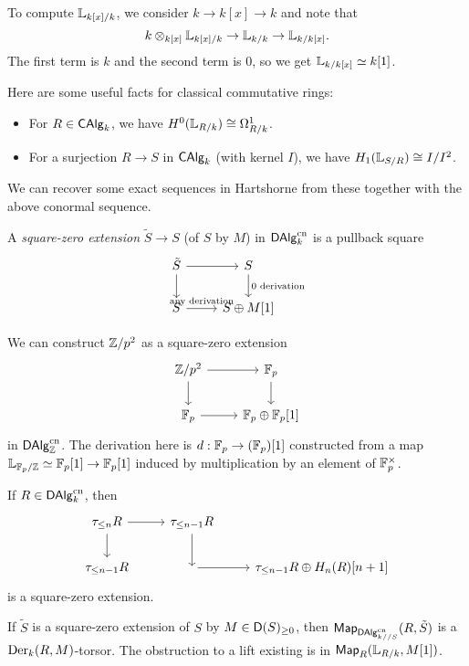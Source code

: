 \documentclass{amsart}
\begin{document}
\begin{ex}
	To compute $\mathbb{L}_{k[x]/k}$, we consider $k \to k[x] \to k$ and note that
	\[
		k \otimes_{k[x]} \mathbb{L}_{k[x]/k} \to \mathbb{L}_{k/k} \to \mathbb{L}_{k/k[x]}.
	\]
	The first term is $k$ and the second term is $0$, so we get $\mathbb{L}_{k/k[x]} \simeq k[1]$.
\end{ex}

Here are some useful facts for classical commutative rings:
\begin{itemize}
	\item For $R \in \mathsf{CAlg}_k$, we have $H^0(\mathbb{L}_{R/k}) \cong \Omega^1_{R/k}$.
	\item For a surjection $R \to S$ in $\mathsf{CAlg}_k$ (with kernel $I$), we have $H_1(\mathbb{L}_{S/R}) \cong I / I^2$.
\end{itemize}
We can recover some exact sequences in Hartshorne from these together with the above conormal sequence.

\begin{dfn}
	A \emph{square-zero extension} $\tilde{S} \to S$ (of $S$ by $M$) in $\mathsf{DAlg}_k^{\mathrm{cn}}$ is a pullback square
	\[
		\begin{tikzcd}
			\tilde{S} \rar \dar & S \dar["0 \textrm{ derivation}"] \\
			S \rar["\textrm{any derivation}"] & S \oplus M[1]
		\end{tikzcd}
	\]
\end{dfn}

\begin{ex}
	We can construct $\mathbb{Z} / p^2$ as a square-zero extension
	\[
		\begin{tikzcd}
			\ZZ / p^2 \rar \dar & \FF_p \dar \\
			\FF_p \rar & \FF_p \oplus \FF_p [1]
		\end{tikzcd}
	\]
	in $\mathsf{DAlg}_{\mathbb{Z}}^{\mathrm{cn}}$.
	The derivation here is $d: \mathbb{F}_p \to (\mathbb{F}_p)[1]$ constructed from a map $\mathbb{L}_{\mathbb{F}_p/\mathbb{Z}} \simeq \mathbb{F}_p[1] \to \mathbb{F}_p[1]$ induced by multiplication by an element of $\mathbb{F}_p^\times$.
\end{ex}

\begin{ex}
	If $R \in \mathsf{DAlg}_k^{\mathrm{cn}}$, then
	\[
		\begin{tikzcd}
			\tau_{\leq n} R \rar \dar & \tau_{\leq n - 1} R \dar \\
			\tau_{\leq n - 1} R & \rar & \tau_{\leq n - 1} R \oplus H_n(R)[n+1]
		\end{tikzcd}
	\]
	is a square-zero extension.
\end{ex}

\begin{prop}
	If $\tilde{S}$ is a square-zero extension of $S$ by $M \in \mathsf{D}(S)_{\geq 0}$, then $\mathsf{Map}_{\mathsf{DAlg}_{k//S}^{\mathrm{cn}}}(R, \tilde{S})$ is a $\operatorname{Der}_k(R, M)$-torsor.
	The obstruction to a lift existing is in $\mathsf{Map}_R(\mathbb{L}_{R/k}, M[1])$.
\end{prop}
\end{document}
